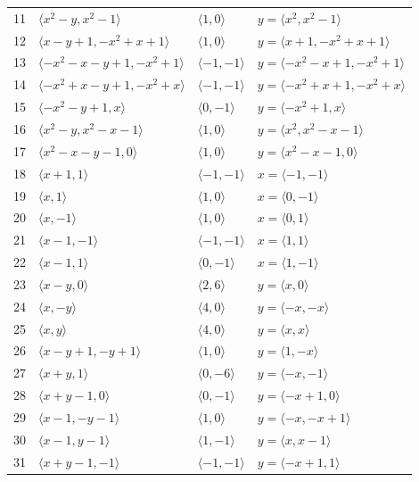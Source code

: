 \documentclass[11pt]{article}
\begin{document}
\begin{longtable}{@{}rlll@{}}
11 & $\langle x^{2}-y,x^{2}-1\rangle$ & $\langle 1,0\rangle$ & $y=\langle x^{2},x^{2}-1\rangle$\\
12 & $\langle x-y+1,-x^{2}+x+1\rangle$ & $\langle 1,0\rangle$ & $y=\langle x+1,-x^{2}+x+1\rangle$\\
13 & $\langle -x^{2}-x-y+1,-x^{2}+1\rangle$ & $\langle -1,-1\rangle$ & $y=\langle -x^{2}-x+1,-x^{2}+1\rangle$\\
14 & $\langle -x^{2}+x-y+1,-x^{2}+x\rangle$ & $\langle -1,-1\rangle$ & $y=\langle -x^{2}+x+1,-x^{2}+x\rangle$\\
15 & $\langle -x^{2}-y+1,x\rangle$ & $\langle 0,-1\rangle$ & $y=\langle -x^{2}+1,x\rangle$\\
16 & $\langle x^{2}-y,x^{2}-x-1\rangle$ & $\langle 1,0\rangle$ & $y=\langle x^{2},x^{2}-x-1\rangle$\\
17 & $\langle x^{2}-x-y-1,0\rangle$ & $\langle 1,0\rangle$ & $y=\langle x^{2}-x-1,0\rangle$\\
18 & $\langle x+1,1\rangle$ & $\langle -1,-1\rangle$ & $x=\langle -1,-1\rangle$\\
19 & $\langle x,1\rangle$ & $\langle 1,0\rangle$ & $x=\langle 0,-1\rangle$\\
20 & $\langle x,-1\rangle$ & $\langle 1,0\rangle$ & $x=\langle 0,1\rangle$\\
21 & $\langle x-1,-1\rangle$ & $\langle -1,-1\rangle$ & $x=\langle 1,1\rangle$\\
22 & $\langle x-1,1\rangle$ & $\langle 0,-1\rangle$ & $x=\langle 1,-1\rangle$\\
23 & $\langle x-y,0\rangle$ & $\langle 2,6\rangle$ & $y=\langle x,0\rangle$\\
24 & $\langle x,-y\rangle$ & $\langle 4,0\rangle$ & $y=\langle -x,-x\rangle$\\
25 & $\langle x,y\rangle$ & $\langle 4,0\rangle$ & $y=\langle x,x\rangle$\\
26 & $\langle x-y+1,-y+1\rangle$ & $\langle 1,0\rangle$ & $y=\langle 1,-x\rangle$\\
27 & $\langle x+y,1\rangle$ & $\langle 0,-6\rangle$ & $y=\langle -x,-1\rangle$\\
28 & $\langle x+y-1,0\rangle$ & $\langle 0,-1\rangle$ & $y=\langle -x+1,0\rangle$\\
29 & $\langle x-1,-y-1\rangle$ & $\langle 1,0\rangle$ & $y=\langle -x,-x+1\rangle$\\
30 & $\langle x-1,y-1\rangle$ & $\langle 1,-1\rangle$ & $y=\langle x,x-1\rangle$\\
31 & $\langle x+y-1,-1\rangle$ & $\langle -1,-1\rangle$ & $y=\langle -x+1,1\rangle$\\

\end{longtable}
\end{document}
